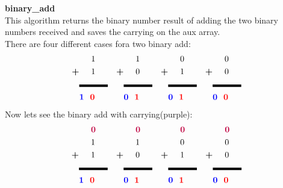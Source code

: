 \documentclass[12pt, twoside, a4paper]{article}
\begin{document}
    \textbf{binary\_add}\\
    This algorithm returns the binary number result of adding the two binary numbers received and saves the carrying on the aux array.\\
    There are four different cases fora two binary add:
    \begin{align*}
      &\hspace{.5cm}1      &    &\hspace{.5cm}1  &  &\hspace{.5cm}0  &  &\hspace{.5cm}0\\
      \textbf{+}&\hspace{.5cm}1     &   \textbf{+}&\hspace{.5cm}0  & \textbf{+}&\hspace{.5cm}1  & \textbf{+}&\hspace{.5cm}0\\
      &\rule{1.2cm}{.1cm} &&\rule{1.2cm}{.1cm}&&\rule{1.2cm}{.1cm}&&\rule{1.2cm}{.1cm}\\
      &\textcolor{blue}{\textbf{1}}\hspace{.25cm}\textcolor{red}{\textbf{0}} &&\textcolor{blue}{\textbf{0}}\hspace{.25cm}\textcolor{red}{\textbf{1}} && \textcolor{blue}{\textbf{0}}\hspace{.25cm}\textcolor{red}{\textbf{1}} && \textcolor{blue}{\textbf{0}}\hspace{.25cm}\textcolor{red}{\textbf{0}}
    \end{align*}
    Now lets see the binary add with carrying(purple):
    \begin{align*}
      &\hspace{.5cm}\textcolor{purple}{\textbf{0}}      &    &\hspace{.5cm}\textcolor{purple}{\textbf{0}}  &  &\hspace{.5cm}\textcolor{purple}{\textbf{0}}  &  &\hspace{.5cm}\textcolor{purple}{\textbf{0}}\\
      &\hspace{.5cm}1      &    &\hspace{.5cm}1  &  &\hspace{.5cm}0  &  &\hspace{.5cm}0\\
      \textbf{+}&\hspace{.5cm}1     &   \textbf{+}&\hspace{.5cm}0  & \textbf{+}&\hspace{.5cm}1  & \textbf{+}&\hspace{.5cm}0\\
      &\rule{1.2cm}{.1cm} &&\rule{1.2cm}{.1cm}&&\rule{1.2cm}{.1cm}&&\rule{1.2cm}{.1cm}\\
      &\textcolor{blue}{\textbf{1}}\hspace{.25cm}\textcolor{red}{\textbf{0}} &&\textcolor{blue}{\textbf{0}}\hspace{.25cm}\textcolor{red}{\textbf{1}} && \textcolor{blue}{\textbf{0}}\hspace{.25cm}\textcolor{red}{\textbf{1}} && \textcolor{blue}{\textbf{0}}\hspace{.25cm}\textcolor{red}{\textbf{0}}
    \end{align*}
\end{document}
